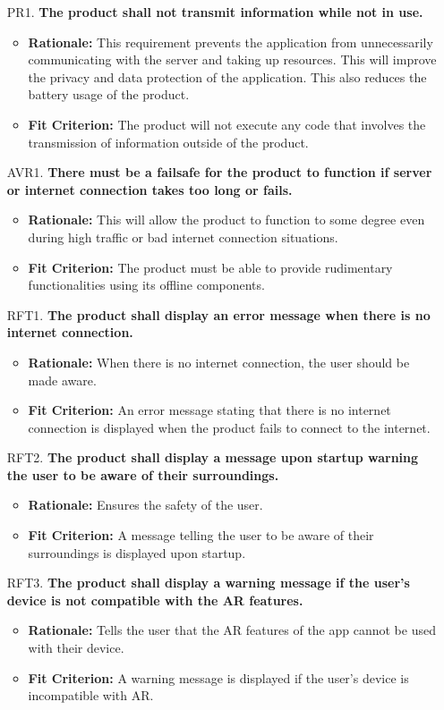 \documentclass{article}
\begin{document}
\begin{itemize}
        \item[PR1.] \textbf{The product shall not transmit information while not in use.}
    \begin{itemize}
        \item \textbf{Rationale:} This requirement prevents the application from unnecessarily communicating with the server and taking up resources. This will improve the privacy and data protection of the application. This also reduces the battery usage of the product.
        \item \textbf{Fit Criterion:} The product will not execute any code that involves the transmission of information outside of the product.
    \end{itemize}
    \item[AVR1.] \textbf{There must be a failsafe for the product to function if server or internet connection takes too long or fails.}
    \begin{itemize}
        \item \textbf{Rationale:} This will allow the product to function to some degree even during high traffic or bad internet connection situations.
        \item \textbf{Fit Criterion:} The product must be able to provide rudimentary functionalities using its offline components.
    \end{itemize}
    \item[RFT1.] \textbf{The product shall display an error message when there is no internet connection.}
    \begin{itemize}
        \item \textbf{Rationale:} When there is no internet connection, the user should be made aware.
        \item \textbf{Fit Criterion:} An error message stating that there is no internet connection is displayed when the product fails to connect to the internet.
    \end{itemize}
    \item[RFT2.] \textbf{The product shall display a message upon startup warning the user to be aware of their surroundings.}
    \begin{itemize}
        \item \textbf{Rationale:} Ensures the safety of the user.
        \item \textbf{Fit Criterion:} A message telling the user to be aware of their surroundings is displayed upon startup.
    \end{itemize}
    \item[RFT3.] \textbf{The product shall display a warning message if the user's device is not compatible with the AR features.}
    \begin{itemize}
        \item \textbf{Rationale:} Tells the user that the AR features of the app cannot be used with their device.
        \item \textbf{Fit Criterion:} A warning message is displayed if the user's device is incompatible with AR.
    \end{itemize}
\end{itemize}
\end{document}
